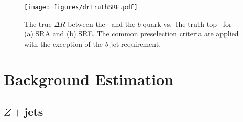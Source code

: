\begin{figure}[h]
	\centering
	\texttt{[image: figures/drTruthSRE.pdf]}
	\caption[$\Delta R$ between the \Wboson\ and the $b$-quark vs. the top \pt]{The true $\Delta R$ between the \Wboson\ and the $b$-quark vs.\ the truth top \pt\ for (a) SRA and (b) SRE. The common preselection criteria are applied with the exception of the $b$-jet requirement.}
	\label{fig:SRBoost_dRWb}
\end{figure}
\clearpage

\section{Background Estimation}
\label{sec:backgroundEstimation}










\subsection{\boldmath$Z+$jets}

